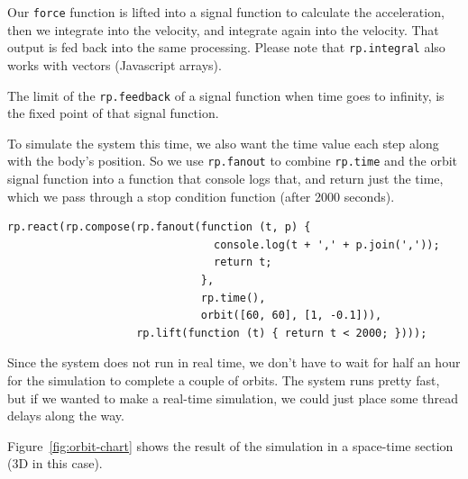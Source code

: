 \documentclass[notitlepage]{article}
\begin{document}
Our \texttt{force} function is lifted into a signal function to calculate the
acceleration, then we integrate into the velocity, and integrate again into the
velocity. That output is fed back into the same processing. Please note that
\texttt{rp.integral} also works with vectors (Javascript arrays).

The limit of the \texttt{rp.feedback} of a signal function when time goes to
infinity, is the fixed point of that signal function.

To simulate the system this time, we also want the time value each step along
with the body's position. So we use \texttt{rp.fanout} to combine
\texttt{rp.time} and the orbit signal function into a function that console
logs that, and return just the time, which we pass through a stop condition
function (after 2000 seconds).

\begin{lstlisting}
rp.react(rp.compose(rp.fanout(function (t, p) {
                                console.log(t + ',' + p.join(','));
                                return t;
                              },
                              rp.time(),
                              orbit([60, 60], [1, -0.1])),
                    rp.lift(function (t) { return t < 2000; })));
\end{lstlisting}

Since the system does not run in real time, we don't have to wait for half an
hour for the simulation to complete a couple of orbits. The system runs pretty
fast, but if we wanted to make a real-time simulation, we could just place some
thread delays along the way.

Figure~\ref{fig:orbit-chart} shows the result of the simulation in a space-time
section (3D in this case).
\end{document}
